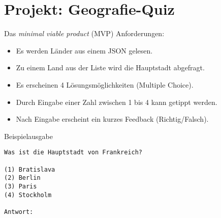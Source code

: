 \section{Projekt: Geografie-Quiz}


\begin{frame}
\begin{block}{Das \emph{minimal viable product} (MVP)}
\vspace{2pt}
Anforderungen: 
\pause 
\begin{itemize}[<+->]
	\item Es werden Länder aus einem JSON gelesen.
	\item Zu einem Land aus der Liste wird die Hauptstadt abgefragt.
	\item Es erscheinen 4 Lösungsmöglichkeiten (Multiple Choice).
	\item Durch Eingabe einer Zahl zwischen 1 bis 4 kann getippt werden. 
	\item Nach Eingabe erscheint ein kurzes Feedback (Richtig/Falsch).  
\end{itemize}
\end{block}
\end{frame}
	
\begin{fragile}
	
\begin{exampleblock}{Beispielausgabe}
\begin{verbatim}
Was ist die Hauptstadt von Frankreich?

(1) Bratislava
(2) Berlin
(3) Paris
(4) Stockholm
 
Antwort: 
\end{verbatim}
\end{exampleblock}
	
	
\end{fragile}